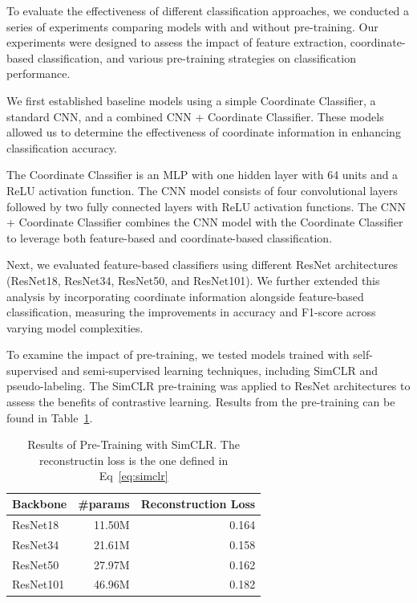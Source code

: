 \documentclass{article}
\begin{document}
To evaluate the effectiveness of different classification approaches, we
conducted a series of experiments comparing models with and without
pre-training. Our experiments were designed to assess the impact of feature
extraction, coordinate-based classification, and various pre-training
strategies on classification performance.

We first established baseline models using a simple Coordinate Classifier, a
standard CNN, and a combined CNN + Coordinate Classifier. These models allowed
us to determine the effectiveness of coordinate information in enhancing
classification accuracy.

The Coordinate Classifier is an MLP with one hidden layer with 64 units and a
ReLU activation function. The CNN model consists of four convolutional layers
followed by two fully connected layers with ReLU activation functions. The CNN
+ Coordinate Classifier combines the CNN model with the Coordinate Classifier
to leverage both feature-based and coordinate-based classification.

Next, we evaluated feature-based classifiers using different ResNet
architectures (ResNet18, ResNet34, ResNet50, and ResNet101). We further
extended this analysis by incorporating coordinate information alongside
feature-based classification, measuring the improvements in accuracy and
F1-score across varying model complexities.

To examine the impact of pre-training, we tested models trained with
self-supervised and semi-supervised learning techniques, including SimCLR and
pseudo-labeling. The SimCLR pre-training was applied to ResNet architectures to
assess the benefits of contrastive learning. Results from the pre-training can
be found in Table~\ref{tab:simclr}.

\begin{table}[!htp]\centering
  \caption{Results of Pre-Training with SimCLR. The reconstructin loss is the one defined in Eq~\ref{eq:simclr}}\label{tab:simclr}
  \scriptsize
  \begin{tabular}{lrr}\toprule
    \textbf{Backbone} & \textbf{\#params} & \textbf{Reconstruction Loss} \\\midrule
    ResNet18          & 11.50M            & 0.164                        \\
    ResNet34          & 21.61M            & 0.158                        \\
    ResNet50          & 27.97M            & 0.162                        \\
    ResNet101         & 46.96M            & 0.182                        \\
    \bottomrule
  \end{tabular}
\end{table}
\end{document}
